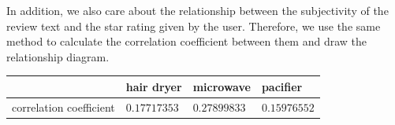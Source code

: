 \documentclass{mcmthesis}
\begin{document}
    In addition, we also care about the relationship between the subjectivity of the review text and the star rating given by the user. Therefore, we use the same method to calculate the correlation coefficient between them and draw the relationship diagram.
    
    \begin{center}
        \begin{tabular}{|l|l|l|l|}
        \hline
                    & hair dryer    & microwave     & pacifier      \\ \hline
            correlation coefficient & $0.17717353$ & $0.27899833$ & $0.15976552$ \\ \hline
        \end{tabular}
    \end{center}
    
\end{document}

